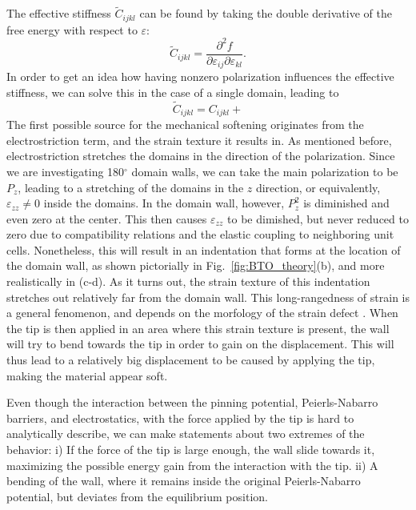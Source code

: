 The effective stiffness $\tilde{C}_{ijkl}$ can be found by taking the double derivative of the free energy with respect to $\varepsilon$:
\begin{equation}
	\tilde{C}_{ijkl} = \frac{\partial^2 f}{\partial \varepsilon_{ij} \partial \varepsilon_{kl}}.
\end{equation}
In order to get an idea how having nonzero polarization influences the effective stiffness, we can solve this in the case of a single domain, leading to
\begin{equation}
\tilde{C}_{ijkl} = C_{ijkl} +  
     \end{equation}
The first possible source for the mechanical softening originates from the electrostriction term, and the strain texture it results in. As mentioned before, electrostriction stretches the domains in the direction of the polarization. Since we are investigating 180$^\circ$ domain walls, we can take the main polarization to be $P_z$, leading to a stretching of the domains in the $z$ direction, or equivalently, $\varepsilon_{zz} \neq 0$ inside the domains. In the domain wall, however, $P_z^2$ is diminished and even zero at the center. This then causes $\varepsilon_{zz}$ to be dimished, but never reduced to zero due to compatibility relations and the elastic coupling to neighboring unit cells. Nonetheless, this will result in an indentation that forms at the location of the domain wall, as shown pictorially in Fig.~\ref{fig:BTO_theory}(b), and more realistically in (c-d). As it turns out, the strain texture of this indentation stretches out relatively far  from the domain wall. This long-rangedness of strain is a general fenomenon, and depends on the morfology of the strain defect . When the tip is then applied in an area where this strain texture is present, the wall will try to bend towards the tip in order to gain on the displacement. This will thus lead to a relatively big displacement to be caused by applying the tip, making the material appear soft.

Even though the interaction between the pinning potential, Peierls-Nabarro barriers, and electrostatics, with the force applied by the tip is hard to analytically describe, we can make statements about two extremes of the behavior: i) If the force of the tip is large enough, the wall slide towards it, maximizing the possible energy gain from the interaction with the tip.  ii) A bending of the wall, where it remains inside the original Peierls-Nabarro potential, but deviates from  the equilibrium position. 


